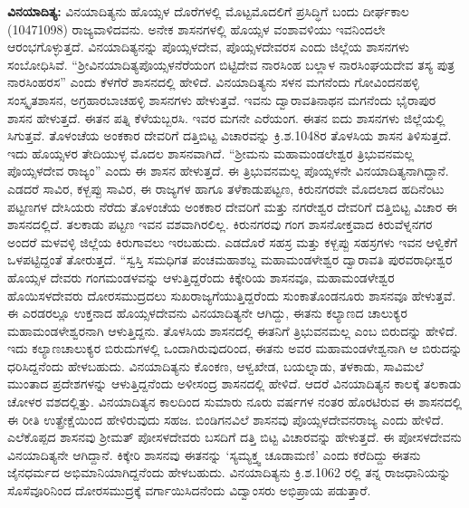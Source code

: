 \textbf{ ವಿನಯಾದಿತ್ಯ:} ವಿನಯಾದಿತ್ಯನು ಹೊಯ್ಸಳ ದೊರೆಗಳಲ್ಲಿ ಮೊಟ್ಟಮೊದಲಿಗೆ ಪ್ರಸಿದ್ಧಿಗೆ ಬಂದು ದೀರ್ಘಕಾಲ (10471098) ರಾಜ್ಯವಾಳಿದವನು. ಅನೇಕ ಶಾಸನಗಳಲ್ಲಿ ಹೊಯ್ಸಳ ವಂಶಾವಳಿಯು ಇವನಿಂದಲೇ ಆರಂಭಗೊಳ್ಳುತ್ತದೆ. ವಿನಯಾದಿತ್ಯನನ್ನು ಪೊಯ್ಸಳದೇವ, ಪೊಯ್ಸಳದೇವರಸ ಎಂದು ಜಿಲ್ಲೆಯ ಶಾಸನಗಳು ಸಂಬೋಧಿಸಿವೆ. “ಶ‍್ರೀವಿನಯಾದಿತ್ಯಪೊಯ್ಸಳನೆರೆಯಂಗ ಬಿಟ್ಟಿದೇವ ನಾರಸಿಂಹ ಬಲ್ಲಾಳ ನಾರಸಿಂಘಯದೇವ ತಸ್ಯ ಪುತ್ರ ನಾರಸಿಂಹರಸ” ಎಂದು ಕೆಳಗೆರೆ ಶಾಸನದಲ್ಲಿ ಹೇಳಿದೆ. ವಿನಯಾದಿತ್ಯನು ಸಳನ ಮಗನೆಂದು ಗೋವಿಂದನಹಳ್ಳಿ ಸಂಸ್ಕೃತಶಾಸನ, ಅಗ್ರಹಾರಬಾಚಹಳ್ಳಿ ಶಾಸನಗಳು ಹೇಳುತ್ತವೆ. ಇವನು ದ್ವಾರಾವತಿನಾಥನ ಮಗನೆಂದು ಭೈರಾಪುರ ಶಾಸನ ಹೇಳುತ್ತದೆ. ಈತನ ಪತ್ನಿ ಕೆಳೆಯಬ್ಬರಸಿ. ಇವರ ಮಗನೇ ಎರೆಯಂಗ. ಈತನ ಐದು ಶಾಸನಗಳು ಜಿಲ್ಲೆಯಲ್ಲಿ ಸಿಗುತ್ತವೆ. ತೊಳಂಚೆಯ ಅಂಕಕಾರ ದೇವರಿಗೆ ದತ್ತಿಬಿಟ್ಟ ವಿಚಾರವನ್ನು ಕ್ರಿ.ಶ.1048ರ ತೊಳಸಿಯ ಶಾಸನ ತಿಳಿಸುತ್ತದೆ. ಇದು ಹೊಯ್ಸಳರ ತೇದಿಯುಳ್ಳ ಮೊದಲ ಶಾಸನವಾಗಿದೆ. “ಶ‍್ರೀಮನು ಮಹಾಮಂಡಲೇಶ್ವರ ತ್ರಿಭುವನಮಲ್ಲ ಪೊಯ್ಸಳದೇವ ರಾಜ್ಯಂ” ಎಂದು ಈ ಶಾಸನ ಹೇಳುತ್ತದೆ. ಈ ತ್ರಿಭುವನಮಲ್ಲ ಪೊಯ್ಸಳನೇ ವಿನಯಾದಿತ್ಯನಾಗಿದ್ದಾನೆ. ಎಡದರೆ ಸಾವಿರ, ಕಳ್ಬಪ್ಪು ಸಾವಿರ, ಈ ರಾಜ್ಯಗಳ ಹಾಗೂ ತಳೆಕಾಡುಪಟ್ಟಣ, ಕಿರುನಗರವೇ ಮೊದಲಾದ ಹದಿನೆಂಟು ಪಟ್ಟಣಗಳ ದೇಸಿಯರು ನೆರೆದು ತೊಳಂಚೆಯ ಅಂಕಕಾರ ದೇವರಿಗೆ ಮತ್ತು ನಗರೇಶ್ವರ ದೇವರಿಗೆ ದತ್ತಿಬಿಟ್ಟ ವಿಚಾರ ಈ ಶಾಸನದಲ್ಲಿದೆ. ತಲಕಾಡು ಪಟ್ಟಣ ಇವನ ವಶವಾಗಿರಲಿಲ್ಲ. ಕಿರುನಗರವು ಗಂಗ ಶಾಸನೋಕ್ತವಾದ ಕಿರುವೆಳ್ನನಗರ ಅಂದರೆ ಮಳವಳ್ಳಿ ಜಿಲ್ಲೆಯ ಕಿರುಗಾವಲು ಇರಬಹುದು. ಎಡದೊರೆ ಸಹಸ್ರ ಮತ್ತು ಕಳ್ಬಪ್ಪು ಸಹಸ್ರಗಳು ಇವನ ಆಳ್ವಿಕೆಗೆ ಒಳಪಟ್ಟಿದ್ದಂತೆ ತೋರುತ್ತದೆ. “ಸ್ವಸ್ತಿ ಸಮಧಿಗತ ಪಂಚಮಹಾಶಬ್ದ ಮಹಾಮಂಡಳೇಶ್ವರ ದ್ವಾರಾವತಿ ಪುರವರಾಧೀಶ್ವರ ಹೊಯ್ಸಳ ದೇವರು ಗಂಗಮಂಡಳವನ್ನು ಆಳುತ್ತಿದ್ದರೆಂದು ಕಿಕ್ಕೇರಿಯ ಶಾಸನವೂ, ಮಹಾಮಂಡಳೇಶ್ವರ ಹೊಯಿಸಳದೇವರು ದೋರಸಮುದ್ರದಲು ಸುಖರಾಜ್ಯಗೆಯುತ್ತಿದ್ದರೆಂದು ಸುಂಕಾತೊಂಡನೂರು ಶಾಸನವೂ ಹೇಳುತ್ತವೆ. ಈ ಎರಡರಲ್ಲೂ ಉಕ್ತನಾದ ಹೊಯ್ಸಳದೇವನು ವಿನಯಾದಿತ್ಯನೇ ಆಗಿದ್ದು, ಈತನು ಕಲ್ಯಾಣದ ಚಾಲುಕ್ಯರ ಮಹಾಮಂಡಳೇಶ್ವರ\-ನಾಗಿ ಆಳುತ್ತಿದ್ದನು. ತೊಳಸಿಯ ಶಾಸನದಲ್ಲಿ ಈತನಿಗೆ ತ್ರಿಭುವನಮಲ್ಲ ಎಂಬ ಬಿರುದನ್ನು ಹೇಳಿದೆ. ಇದು ಕಲ್ಯಾಣಚಾಲುಕ್ಯರ ಬಿರುದುಗಳಲ್ಲಿ ಒಂದಾಗಿರುವುದರಿಂದ, ಈತನು ಅವರ ಮಹಾಮಂಡಳೇಶ್ವನಾಗಿ ಆ ಬಿರುದನ್ನು ಧರಿಸಿದ್ದನೆಂದು ಹೇಳಬಹುದು. ವಿನಯಾದಿತ್ಯನು ಕೊಂಕಣ, ಆಳ್ವಖೇಡ, ಬಯಲ್ನಾಡು, ತಳಕಾಡು, ಸಾವಿಮಲೆ ಮುಂತಾದ ಪ್ರದೇಶಗಳನ್ನು ಆಳುತ್ತಿದ್ದನೆಂದು ಅಳೀಸಂದ್ರ ಶಾಸನದಲ್ಲಿ ಹೇಳಿದೆ. ಆದರೆ ವಿನಯಾದಿತ್ಯನ ಕಾಲಕ್ಕೆ ತಲಕಾಡು ಚೋಳರ ವಶದಲ್ಲಿತ್ತು. ವಿನಯಾದಿತ್ಯನ ಕಾಲದಿಂದ ಸುಮಾರು ನೂರು ವರ್ಷಗಳ ನಂತರ ಹೊರಟಿರುವ ಈ ಶಾಸನದಲ್ಲಿ ಈ ರೀತಿ ಉತ್ಪ್ರೇಕ್ಷೆಯಿಂದ ಹೇಳಿರುವುದು ಸಹಜ. ಬಿಂಡಿಗನವಿಲೆ ಶಾಸನವು ಪೊಯ್ಸಳದೇವನರಾಜ್ಯ ಎಂದು ಹೇಳಿದೆ. ಎಲೆಕೊಪ್ಪದ ಶಾಸನವು ಶ‍್ರೀಮತ್​ ಪೋಸಳದೇವರು ಬಸದಿಗೆ ದತ್ತಿ ಬಿಟ್ಟ ವಿಚಾರವನ್ನು ಹೇಳುತ್ತದೆ. ಈ ಪೋಸಳದೇವನು ವಿನಯಾದಿತ್ಯನೇ ಆಗಿದ್ದಾನೆ. ಕಿಕ್ಕೇರಿ ಶಾಸನವು ಈತನನ್ನು ‘ಸ್ಯಮ್ಯಕ್ತ್ವ ಚೂಡಾಮಣಿ’ ಎಂದು ಕರೆದಿದ್ದು ಈತನು ಜೈನಧರ್ಮದ ಅಭಿಮಾನಿಯಾಗಿದ್ದನೆಂದು ಹೇಳಬಹುದು. ವಿನಯಾದಿತ್ಯನು ಕ್ರಿ.ಶ.1062 ರಲ್ಲಿ ತನ್ನ ರಾಜಧಾನಿಯನ್ನು ಸೊಸೆವೂರಿನಿಂದ ದೋರಸಮುದ್ರಕ್ಕೆ ವರ್ಗಾಯಿಸಿದನೆಂದು ವಿದ್ವಾಂಸರು ಅಭಿಪ್ರಾಯ ಪಡುತ್ತಾರೆ.

